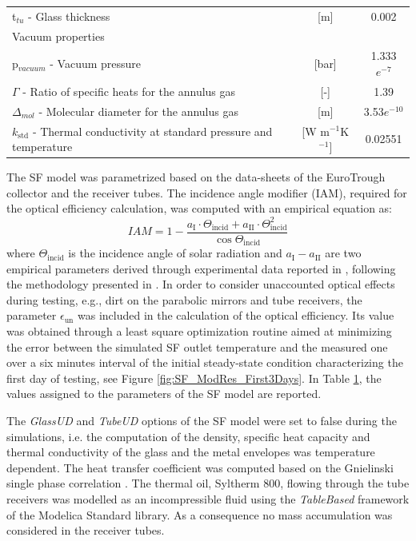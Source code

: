 \documentclass[final,3p,times,review]{elsarticle}
\begin{document}
\begin{table}[h!]
\begin{tabularx}{\textwidth}{Xcc}
		\hspace*{0.3cm} t$_{tu}$ - Glass thickness  & [m] & 0.002\\
		Vacuum properties &  &  \\
		\hspace*{0.3cm} p$_{vacuum}$ - Vacuum pressure & [bar] & 1.333$e^{-7}$\\
		\hspace*{0.3cm} $\Gamma$ - Ratio of specific heats for the annulus gas & [-] & 1.39\\
		\hspace*{0.3cm} $\Delta_{mol}$ - Molecular diameter for the annulus gas & [m] & 3.53$e^{-10}$\\
		\hspace*{0.3cm} $k_\mathrm{std}$ - Thermal conductivity at standard pressure and temperature & [W m$^{-1}$K$^{-1}$] & 0.02551\\
		\bottomrule
	\end{tabularx}%
	\label{tab:SF_parameter}%
\end{table}%
%
The SF model was parametrized based on the data-sheets of the EuroTrough collector and the receiver tubes. The incidence angle modifier (IAM), required for the optical efficiency calculation, was computed with an empirical equation as:
%
\begin{equation}
IAM = 1 - \frac{a_\mathrm{I} \cdot \Theta_\mathrm{incid} + a_\mathrm{II}\cdot \Theta_\mathrm{incid}^2}{\cos{\Theta_\mathrm{incid}}}
\end{equation} 
%
where $\Theta_\mathrm{incid}$ is the incidence angle of solar radiation and $a_\mathrm{I}-a_\mathrm{II}$ are two empirical parameters derived through experimental data reported in \cite{Sallaberry2016}, following the methodology presented in \cite{Valenzuela2014}. In order to consider unaccounted optical effects during testing, e.g., dirt on the parabolic mirrors and tube receivers, the parameter $\epsilon_\mathrm{un}$ was included in the calculation of the optical efficiency. Its value was obtained through a least square optimization routine aimed at minimizing the error between the simulated SF outlet temperature and the measured one over a six minutes interval  of the initial steady-state condition characterizing the first day of testing, see Figure \ref{fig:SF_ModRes_First3Days}. In Table \ref{tab:SF_parameter}, the values assigned to the parameters of the SF model are reported.
%

%
The \textit{GlassUD} and \textit{TubeUD} options of the SF model were set to false during the simulations, i.e.  the computation of the density, specific heat capacity and thermal conductivity of the glass and the metal envelopes was temperature dependent.
The heat transfer coefficient was computed based on the Gnielinski single phase correlation \cite{Gnielinski2010}.
The thermal oil, Syltherm 800, flowing through the tube receivers was modelled as an incompressible fluid using the \textit{TableBased} framework of the Modelica Standard library. As a consequence no mass accumulation was considered in the receiver tubes.
\end{document}

